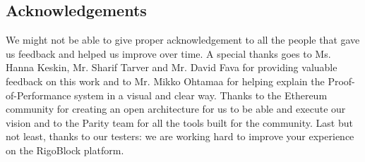 \documentclass[9pt,oneside]{amsart}
\begin{document}
\begin{multicols}{2}
\section{Acknowledgements}
We might not be able to give proper acknowledgement to all the people that gave us feedback and helped us improve over time. A special thanks goes to Ms. Hanna Keskin, Mr. Sharif Tarver and Mr. David Fava for providing valuable feedback on this work and to Mr. Mikko Ohtamaa for helping explain the Proof-of-Performance system in a visual and clear way. Thanks to the Ethereum community for creating an open architecture for us to be able and execute our vision and to the Parity team for all the tools built for the community. Last but not least, thanks to our testers: we are working hard to improve your experience on the RigoBlock platform.

\end{multicols}
\end{document}
